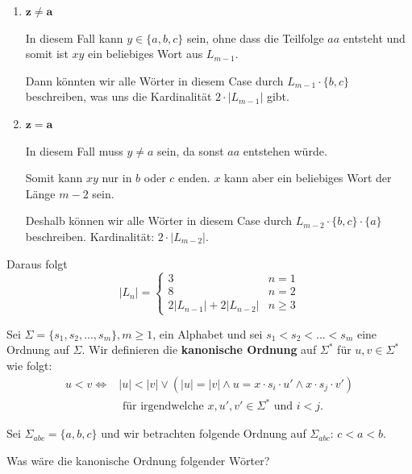 \documentclass[a4paper, 11pt]{article}
\begin{document}
	\begin{enumerate}[label= (\alph*)]
		
		\item $\boldsymbol{z \neq a}$
		
		In diesem Fall kann $y \in \{a,b,c\}$ sein, ohne dass die Teilfolge $aa$ entsteht und somit ist $xy$ ein beliebiges Wort aus $L_{m-1}$. 
		
		Dann könnten wir alle Wörter in diesem Case durch $L_{m-1}\cdot \{b,c\}$ beschreiben, was uns die Kardinalität $2 \cdot |L_{m-1}|$ gibt.
		
		\item $\boldsymbol{z = a}$
		
		In diesem Fall muss $y \neq a$ sein, da sonst $aa$ entstehen würde. 
		
		Somit kann $xy$ nur in $b$ oder $c$ enden. $x$ kann aber ein beliebiges Wort der Länge $m-2$ sein. 
		
		Deshalb können wir alle Wörter in diesem Case durch $L_{m-2}\cdot\{b, c\} \cdot \{a\}$ beschreiben. Kardinalität: $2 \cdot |L_{m-2}|$.
	\end{enumerate}

    Daraus folgt $$|L_n| = \begin{cases}
        3 &  n = 1\\
        8 & n = 2\\
        2|L_{n-1}|+ 2|L_{n-2}| &n \geq 3
    \end{cases}$$

\vspace*{1cm}

	
	\begin{mainbox}{}
		Sei $\Sigma = \{s_1,s_2, ...,s_m\}, m \geq 1$, ein Alphabet und sei $s_1 < s_2 < ... <s_m$ eine Ordnung auf $\Sigma$. Wir definieren die \textbf{kanonische Ordnung} auf $\Sigma^*$ für $u, v \in \Sigma^*$ wie folgt:
		\begin{align*}
			u < v \iff &|u| < |v| \lor (|u| = |v| \land u = x\cdot s_i \cdot u' \land x \cdot s_j \cdot v') \\
			&\text{ für irgendwelche } x, u', v' \in \Sigma^* \text{ und } i < j. 
		\end{align*}
	\end{mainbox}



	Sei $\Sigma_{abc} = \{a, b, c\}$ und wir betrachten folgende Ordnung auf $\Sigma_{abc}$: $c < a < b$.

	Was wäre die kanonische Ordnung folgender Wörter?
\end{document}
